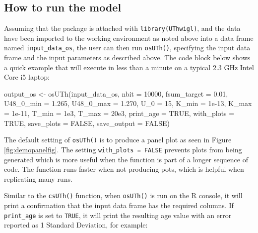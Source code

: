 \documentclass[]{elsarticle} %
\newenvironment{Shaded}{\begin{snugshade}}{\end{snugshade}}
\newcommand{\AttributeTok}[1]{\textcolor[rgb]{0.77,0.63,0.00}{#1}}
\newcommand{\ConstantTok}[1]{\textcolor[rgb]{0.00,0.00,0.00}{#1}}
\newcommand{\DecValTok}[1]{\textcolor[rgb]{0.00,0.00,0.81}{#1}}
\newcommand{\FloatTok}[1]{\textcolor[rgb]{0.00,0.00,0.81}{#1}}
\newcommand{\FunctionTok}[1]{\textcolor[rgb]{0.00,0.00,0.00}{#1}}
\newcommand{\NormalTok}[1]{#1}
\newcommand{\OtherTok}[1]{\textcolor[rgb]{0.56,0.35,0.01}{#1}}
\begin{document}
\hypertarget{how-to-run-the-model-1}{%
\subsection{How to run the model}\label{how-to-run-the-model-1}}

Assuming that the package is attached with \texttt{library(UThwigl)}, and the data have been imported to the working environment as noted above into a data frame named \texttt{input\_data\_os}, the user can then run \texttt{osUTh()}, specifying the input data frame and the input parameters as described above. The code block below shows a quick example that will execute in less than a minute on a typical 2.3 GHz Intel Core i5 laptop:

\begin{Shaded}
\begin{Highlighting}[]
\NormalTok{output\_os }\OtherTok{\textless{}{-}} \FunctionTok{osUTh}\NormalTok{(input\_data\_os,}
                   \AttributeTok{nbit =} \DecValTok{10000}\NormalTok{,}
                   \AttributeTok{fsum\_target =} \FloatTok{0.01}\NormalTok{,}
                   \AttributeTok{U48\_0\_min =} \FloatTok{1.265}\NormalTok{,}
                   \AttributeTok{U48\_0\_max =} \FloatTok{1.270}\NormalTok{,}
                   \AttributeTok{U\_0 =} \DecValTok{15}\NormalTok{,}
                   \AttributeTok{K\_min =} \FloatTok{1e{-}13}\NormalTok{,}
                   \AttributeTok{K\_max =} \FloatTok{1e{-}11}\NormalTok{,}
                   \AttributeTok{T\_min =} \FloatTok{1e3}\NormalTok{,}
                   \AttributeTok{T\_max =} \FloatTok{20e3}\NormalTok{,}
                   \AttributeTok{print\_age =} \ConstantTok{TRUE}\NormalTok{,}
                   \AttributeTok{with\_plots =} \ConstantTok{TRUE}\NormalTok{,}
                   \AttributeTok{save\_plots =} \ConstantTok{FALSE}\NormalTok{,}
                   \AttributeTok{save\_output =} \ConstantTok{FALSE}\NormalTok{)}
\end{Highlighting}
\end{Shaded}

The default setting of \texttt{osUTh()} is to produce a panel plot as seen in Figure \ref{fig:demopanelfig}. The setting \texttt{with\_plots\ =\ FALSE} prevents plots from being generated which is more useful when the function is part of a longer sequence of code. The function runs faster when not producing pots, which is helpful when replicating many runs.

Similar to the \texttt{csUTh()} function, when \texttt{osUTh()} is run on the R console, it will print a confirmation that the input data frame has the required columns. If \texttt{print\_age} is set to \texttt{TRUE}, it will print the resulting age value with an error reported as 1 Standard Deviation, for example:
\end{document}
